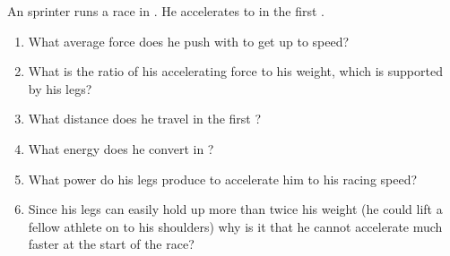 
\begin{problem}[Robin5]
{An  sprinter runs a  race in . He accelerates to  in the first .
\begin{enumerate}
	\item What average force does he push with to get up to speed?
	\item What is the ratio of his accelerating force to his weight, which is supported by his legs?
	\item What distance does he travel in the first ?
	\item What energy does he convert in ?
	\item What power do his legs produce to accelerate him to his racing speed?
	\item Since his legs can easily hold up more than twice his weight (he could lift a fellow athlete on to his shoulders) why is it that he cannot accelerate much faster at the start of the race?
\end{enumerate}
}
{}
{}
\end{problem}